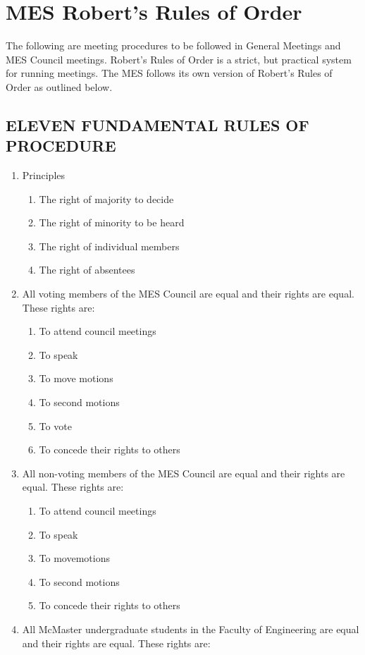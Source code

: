 \section{MES Robert's Rules of Order}
\label{mes-roberts-rules-of-order}
The following are meeting procedures to be followed in General Meetings
and MES Council meetings. Robert's Rules of Order is a strict, but
practical system for running meetings. The MES follows its own version
of Robert's Rules of Order as outlined below.

\subsection{ELEVEN FUNDAMENTAL RULES OF PROCEDURE}
\label{eleven-fundamental-rules-of-procedure}

\begin{enumerate}
 \item
  Principles

  \begin{enumerate}
   \item
    The right of majority to decide
   \item
    The right of minority to be heard
   \item
    The right of individual members
   \item
    The right of absentees
  \end{enumerate}
 \item
  All voting members of the MES Council are equal and their rights are equal. These rights are:

  \begin{enumerate}
   \item
    To attend council meetings
   \item
    To speak
   \item
    To move motions
   \item
    To second motions
   \item
    To vote
   \item
    To concede their rights to others
  \end{enumerate}
 \item
  All non-voting members of the MES Council are equal and their rights are equal. These rights are:

  \begin{enumerate}
   \item
    To attend council meetings
   \item
    To speak
   \item
    To movemotions %
   \item
    To second motions
   \item
    To concede their rights to others
  \end{enumerate}
 \item
  All McMaster undergraduate students in the Faculty of Engineering are equal and their rights are equal. These rights are:


\end{enumerate}
